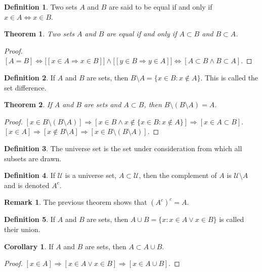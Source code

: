 \documentclass[oneside]{book}
\newtheorem{theorem}{Theorem}[section]
\theoremstyle{definition}
\newtheorem{definition}{Definition}[section]
\newtheorem{corollary}{Corollary}[section]
\newtheorem{remark}{Remark}[section]
\begin{document}
\begin{definition}
Two sets $A$ and $B$ are said to be equal if and only if $x\in A \Leftrightarrow x\in B$.
\end{definition}

\begin{theorem}
Two sets $A$ and $B$ are equal if and only if $A\subset B$ and $B\subset A$.
\end{theorem}
\begin{proof}
$[A=B]\Leftrightarrow\big[[x\in A \Rightarrow x\in B]\big]\land \big[[y\in B \Rightarrow y\in A]\big]\Leftrightarrow [A\subset B\land B\subset A]$. 
\end{proof}

\begin{definition}
If $A$ and $B$ are sets, then $B\setminus A = \{x\in B:x\notin A\}$. This is called the set difference.
\end{definition}

\begin{theorem}
If $A$ and $B$ are sets and $A\subset B$, then $B\setminus(B\setminus A)=A$.
\end{theorem}
\begin{proof}
$[x\in B\setminus(B\setminus A)]\Rightarrow [x\in B \land x\notin \{x\in B:x\notin A\}]\Rightarrow [x\in A\subset B]$. $[x\in A]\Rightarrow [x\notin B\setminus A]\Rightarrow [x\in B\setminus(B\setminus A)]$.
\end{proof}

\begin{definition}
The universe set is the set under consideration from which all subsets are drawn.
\end{definition}

\begin{definition}
If $\mathcal{U}$ is a universe set, $A\subset \mathcal{U}$, then the complement of $A$ is $\mathcal{U}\setminus A$ and is denoted $A^c$.
\end{definition}

\begin{remark}
The previous theorem shows that $(A^c)^c = A$.
\end{remark}

\begin{definition}
If $A$ and $B$ are sets, then $A\cup B = \{x: x\in A \lor x\in B\}$ is called their union.
\end{definition}

\begin{corollary}
If $A$ and $B$ are sets, then $A\subset A\cup B$.
\end{corollary}
\begin{proof}
$[x\in A]\Rightarrow [x\in A\lor x\in B]\Rightarrow [x\in A\cup B]$.
\end{proof}
\end{document}
